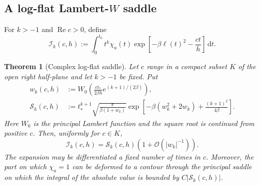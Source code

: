 \documentclass[11pt]{article}
\newtheorem{theorem}{Theorem}[section]
\newcommand{\dd}{\,\mathrm d}
\newcommand{\cO}{\mathcal O}
\newcommand{\Rea}{\operatorname{Re}}
\begin{document}
\subsection{A log-flat Lambert-\texorpdfstring{$W$}{W} saddle}
For $k>-1$ and $\Rea c>0$, define
\begin{equation}\label{eq:Ik-def}
 \mathcal I_k(c,h)
 :=\int_0^{t_0}t^k\chi_a(t)
 \exp\!\left[-\beta\ell(t)^2-\frac{ct}{h}\right]\dd t.
\end{equation}

\begin{theorem}[Complex log-flat saddle]
\label{thm:log-flat-complex-saddle}
Let $c$ range in a compact subset $K$ of the open right half-plane and let
$k>-1$ be fixed.  Put
\begin{align}
 w_k(c,h)&:=W_0\!\left(
 \frac{ct_*}{2\beta h}e^{(k+1)/(2\beta)}\right),
 \label{eq:wk-def}\\
 \mathcal S_k(c,h)&:=t_*^{k+1}
 \sqrt{\frac{\pi}{\beta(1+w_k)}}
 \exp\!\left[-\beta(w_k^2+2w_k)
 +\frac{(k+1)^2}{4\beta}\right].
 \label{eq:Qk-def}
\end{align}
Here $W_0$ is the principal Lambert function and the square root is continued
from positive $c$.  Then, uniformly for $c\in K$,
\begin{equation}\label{eq:Ik-asymptotic}
 \mathcal I_k(c,h)=\mathcal S_k(c,h)
 \left(1+\cO\!\left(|w_k|^{-1}\right)\right).
\end{equation}
The expansion may be differentiated a fixed number of times in $c$.
Moreover, the part on which $\chi_a=1$ can be deformed to a contour through
the principal saddle on which the integral of the absolute value is bounded
by $C|\mathcal S_k(c,h)|$.
\end{theorem}
\end{document}
